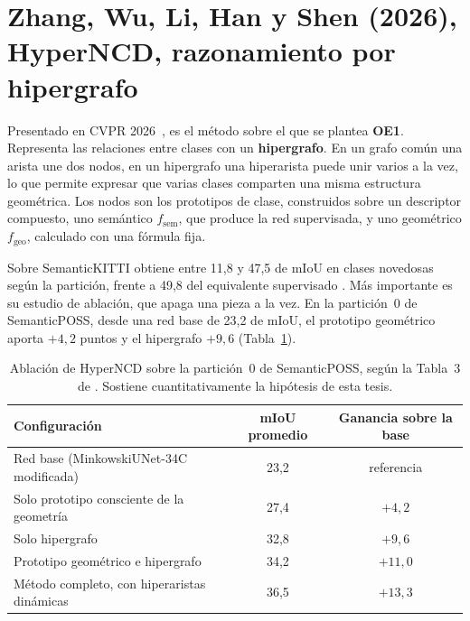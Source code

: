 \section[HyperNCD]{Zhang, Wu, Li, Han y Shen (2026), HyperNCD, razonamiento por
hipergrafo}
\label{sec:hyperncd}

Presentado en CVPR 2026~\cite{zhang2026hyperncd}, es el método sobre el que se
plantea \textbf{OE1}. Representa las relaciones entre clases con un
\textbf{hipergrafo}. En un grafo común una arista une dos nodos, en un hipergrafo una hiperarista puede
unir varios a la vez, lo que permite expresar que varias clases comparten
una misma estructura geométrica. Los nodos son los prototipos de clase,
construidos sobre un descriptor compuesto, uno semántico $f_{\text{sem}}$, que
produce la red supervisada, y uno geométrico $f_{\text{geo}}$, calculado con una
fórmula fija.

Sobre SemanticKITTI obtiene entre 11,8 y 47,5 de mIoU en clases novedosas según
la partición, frente a 49,8 del equivalente supervisado
\cite[Tabla~1]{zhang2026hyperncd}. Más importante es su estudio de ablación, que apaga una pieza a la vez. En la
partición~0 de SemanticPOSS, desde una red base de 23,2 de mIoU, el prototipo
geométrico aporta $+4{,}2$ puntos y el hipergrafo $+9{,}6$
(Tabla~\ref{tab:ablacion-hyperncd}).

\begin{table}[!htbp]
\centering
{}\small
\caption[Ablación de HyperNCD en SemanticPOSS]{Ablación de HyperNCD sobre la partición~0 de SemanticPOSS, según la
Tabla~3 de \cite{zhang2026hyperncd}. Sostiene cuantitativamente la hipótesis de esta tesis.}
\label{tab:ablacion-hyperncd}
\begin{tabularx}{\linewidth}{@{}>{\raggedright\arraybackslash\hsize=1.00\hsize}Xcc@{}}
\hline
Configuración & mIoU promedio & Ganancia sobre la base \\
\hline
Red base (MinkowskiUNet-34C modificada) & 23,2 & referencia \\
Solo prototipo consciente de la geometría & 27,4 & $+4{,}2$ \\
Solo hipergrafo & 32,8 & $+9{,}6$ \\
Prototipo geométrico e hipergrafo & 34,2 & $+11{,}0$ \\
Método completo, con hiperaristas dinámicas & 36,5 & $+13{,}3$ \\
\hline
\end{tabularx}
\end{table}

